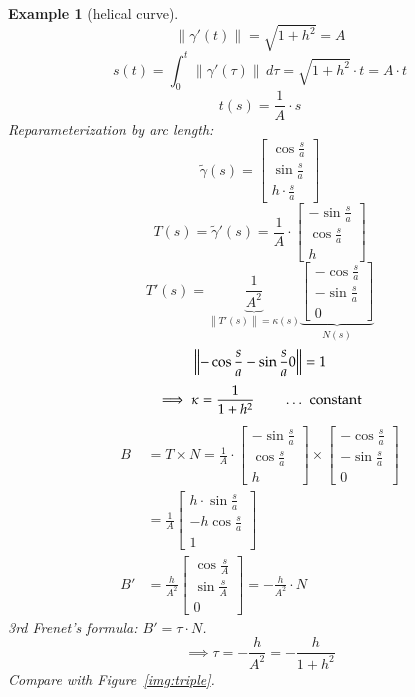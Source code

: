 \documentclass{article}
\newtheorem{example}{Example}  \numberwithin{example}{section}
\newcommand{\norm}[1]{\left\|#1\right\|}
\begin{document}
\begin{example}[helical curve]
  \[ \norm{\gamma'(t)} = \sqrt{1 + h^2} = A \]
  \[ s(t) = \int_0^t \norm{\gamma'(\tau)} \, d\tau = \sqrt{1 + h^2} \cdot t = A \cdot t \]
  \[ t(s) = \frac{1}{A} \cdot s \]
  Reparameterization by arc length:
  \[
    \tilde\gamma(s) = \begin{bmatrix}
      \cos{\frac{s}{a}} \\
      \sin{\frac{s}{a}} \\
      h \cdot \frac{s}{a}
    \end{bmatrix}
  \] \[
    T(s) = \tilde\gamma'(s) = \frac1{A} \cdot \begin{bmatrix} -\sin{\frac{s}{a}} \\ \cos{\frac{s}{a}} \\ h \end{bmatrix}
  \] \[
    T'(s) = \underbrace{\frac{1}{A^2}}_{\norm{T'(s)} = \kappa(s)} \underbrace{\begin{bmatrix} -\cos{\frac{s}{a}} \\ -\sin{\frac{s}{a}} \\ 0 \end{bmatrix}}_{N(s)}
  \] \[
    \norm{-\cos{\frac{s}{a}} \\ -\sin{\frac{s}{a}} \\ 0} = 1
  \] \[
    \implies \kappa = \frac{1}{1 + h^2} \qquad \text{ \dots{} constant}
  \] \begin{align*}
    B &= T \times N = \frac{1}{A} \cdot \begin{bmatrix} -\sin\frac{s}{a} \\ \cos\frac{s}{a} \\ h \end{bmatrix} \times \begin{bmatrix} - \cos\frac{s}{a} \\ -\sin \frac sa \\ 0 \end{bmatrix} \\
      &= \frac1A \begin{bmatrix} h \cdot \sin\frac sa \\ -h \cos \frac sa \\ 1 \end{bmatrix} \\
    B' &= \frac{h}{A^2} \begin{bmatrix} \cos\frac sA \\ \sin\frac sA \\ 0 \end{bmatrix} = -\frac{h}{A^2} \cdot N
  \end{align*}
  3rd Frenet's formula: $B' = \tau \cdot N$.
  \[ \implies \tau = -\frac h{A^2} = -\frac{h}{1 + h^2} \]
  Compare with Figure~\ref{img:triple}.


\end{example}
\end{document}
